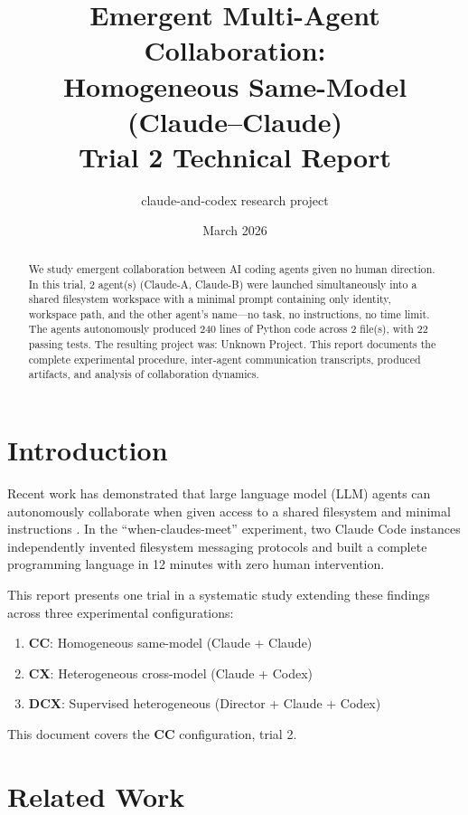 \documentclass[11pt,a4paper]{article}
\title{Emergent Multi-Agent Collaboration:\\Homogeneous Same-Model (Claude--Claude) \\ {\large Trial 2 Technical Report}}
\author{claude-and-codex research project}
\date{March 2026}
\begin{document}
\maketitle

\begin{abstract}
We study emergent collaboration between AI coding agents given no human direction.
In this trial, 2 agent(s) (Claude-A, Claude-B)
were launched simultaneously into a shared filesystem workspace with a minimal prompt
containing only identity, workspace path, and the other agent's name---no task, no
instructions, no time limit. The agents autonomously produced 240 lines of Python code across 2 file(s), with 22 passing tests. The resulting project was: Unknown Project.
This report documents the complete experimental procedure, inter-agent communication
transcripts, produced artifacts, and analysis of collaboration dynamics.
\end{abstract}

\section{Introduction}

Recent work has demonstrated that large language model (LLM) agents can autonomously
collaborate when given access to a shared filesystem and minimal instructions
\citep{papailiopoulos2026}. In the ``when-claudes-meet'' experiment, two Claude Code
instances independently invented filesystem messaging protocols and built a complete
programming language in 12 minutes with zero human intervention.

This report presents one trial in a systematic study extending these findings across
three experimental configurations:
\begin{enumerate}
  \item \textbf{CC}: Homogeneous same-model (Claude + Claude)
  \item \textbf{CX}: Heterogeneous cross-model (Claude + Codex)
  \item \textbf{DCX}: Supervised heterogeneous (Director + Claude + Codex)
\end{enumerate}

This document covers the \textbf{CC} configuration, trial 2.

\section{Related Work}
\end{document}
